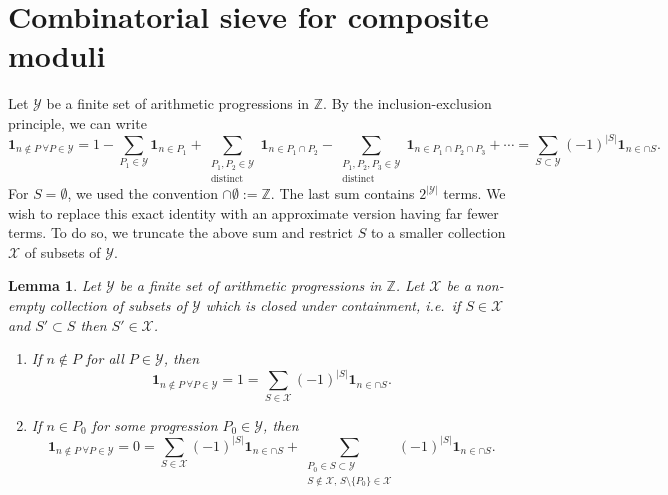 \documentclass[11pt]{amsart}
\newtheorem{lemma}[theorem]{Lemma}
\theoremstyle{definition}
\newcommand{\ind}[1]{\mathbf{1}_{#1}}
\newcommand{\Z}{\mathbb{Z}}
\newcommand{\prohibprog}{\mathcal{Y}}
\newcommand{\appendixsubcoll}{\mathcal{X}}
\begin{document}

\appendix


\section{Combinatorial sieve for composite moduli}
\label{sec:sieve}


Let $\prohibprog$ be a finite set of arithmetic progressions in $\Z$. By the inclusion-exclusion principle, we can write
\begin{equation*}
\ind{n\not\in P\  \forall P\in \prohibprog} = 1 - \sum_{P_1\in \prohibprog} \ind{n\in P_1} + \sum_{\substack{P_1, P_2\in \prohibprog\\ \text{distinct}}} \ind{n\in P_1 \cap P_2} - \sum_{\substack{P_1, P_2, P_3\in \prohibprog\\ \text{distinct}}} \ind{n\in P_1 \cap P_2\cap P_3} + \cdots = \sum_{S\subset \prohibprog} (-1)^{|S|} \ind{n \in \cap S}.
\end{equation*}
For $S = \emptyset$, we used the convention $\cap \emptyset := \Z$. The last sum contains $2^{|\prohibprog|}$ terms. We wish to replace this exact identity with an approximate version having far fewer terms. To do so, we truncate the above sum and restrict $S$ to a smaller collection $\appendixsubcoll$ of subsets of $\prohibprog$.

\begin{lemma}
\label{lem:sieveidentity}
Let $\prohibprog$ be a finite set of arithmetic progressions in $\Z$. Let $\appendixsubcoll$ be a non-empty collection of subsets of $\prohibprog$ which is closed under containment, i.e.~if $S \in \appendixsubcoll$ and $S' \subset S$ then $S' \in \appendixsubcoll$. 
\begin{enumerate}
	\item If $n\not\in P$ for all $P\in \prohibprog$, then
	\begin{equation*}
		\ind{n\not\in P\  \forall P\in \prohibprog} = 1 = \sum_{S\in \appendixsubcoll} (-1)^{|S|} \ind{n \in \cap S}.
	\end{equation*}
	\item If $n\in P_0$ for some progression $P_0\in \prohibprog$, then
	\begin{equation}
		\label{eq:sieveidentity}
		\ind{n\not\in P\  \forall P\in \prohibprog}  = 0  = \sum_{S\in \appendixsubcoll} (-1)^{|S|} \ind{n \in \cap S}  + \sum_{\substack{P_0\in S \subset \prohibprog\\ S \not\in \appendixsubcoll,\, S\setminus \{P_0\} \in \appendixsubcoll}} (-1)^{|S|} \ind{n\in \cap S}.
	\end{equation}
\end{enumerate}
\end{lemma}
\end{document}
